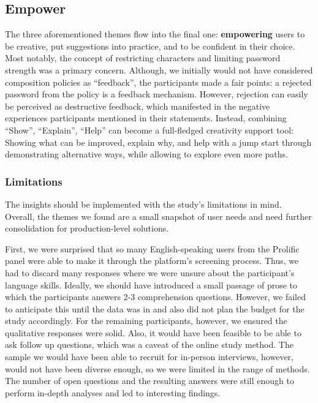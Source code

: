 \subsection{Empower}
The three aforementioned themes flow into the final one: \textbf{empowering} users to be creative, put suggestions into practice, and to be confident in their choice. Most notably, the concept of restricting characters and limiting password strength was a primary concern. Although, we initially would not have considered composition policies as ``feedback'', the participants made a fair points: a rejected password from the policy is a feedback mechanism. However, rejection can easily be perceived as destructive feedback, which manifested in the negative experiences participants mentioned in their statements. Instead, combining ``Show'', ``Explain'', ``Help'' can become a full-fledged creativity support tool: Showing what can be improved, explain why, and help with a jump start through demonstrating alternative ways, while allowing to explore even more paths. 




\subsubsection{Limitations}
The insights should be implemented with the study's limitations in mind. Overall, the themes we found are a small snapshot of user needs and need further consolidation for production-level solutions. 

First, we were surprised that so many English-speaking users from the Prolific panel were able to make it through the platform's screening process. Thus, we had to discard many responses where we were unsure about the participant's language skills. Ideally, we should have introduced a small passage of prose to which the participants answers 2-3 comprehension questions. However, we failed to anticipate this until the data was in and also did not plan the budget for the study accordingly. For the remaining participants, however, we ensured the qualitative responses were solid. 
Also, it would have been feasible to be able to ask follow up questions, which was a caveat of the online study method. The sample we would have been able to recruit for in-person interviews, however, would not have been diverse enough, so we were limited in the range of methods. The number of open questions and the resulting answers were still enough to perform in-depth analyses and led to interesting findings. %

